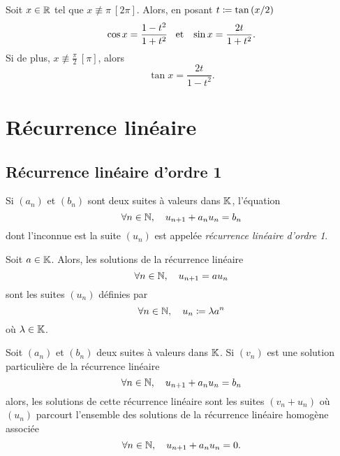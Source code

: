 \documentclass{magnolia}
\begin{document}
\begin{proposition}[utile=-3]
Soit $x\in\mathbb{R}$ tel que $x\not\equiv \pi\ [2\pi]$. Alors, en posant $t\coloneqq\tan\left(x/2\right)$
\[\cos x=\frac{1-t^2}{1+t^2} \quad\!\text{et}\quad\! \sin x=\frac{2t}{1+t^2}.\]
Si de plus, $x\not\equiv\frac{\pi}{2}\ [\pi]$, alors
\[\tan x=\frac{2t}{1-t^2}.\]
\end{proposition}



\section{Récurrence linéaire}

 \subsection{Récurrence linéaire d'ordre 1}


\begin{definition}
Si $(a_n)$ et $(b_n)$ sont deux suites à valeurs dans $\mathbb{K}$, l'équation
\[\forall n\in\mathbb{N},\quad u_{n+1} + a_n u_n = b_n\]
dont l'inconnue est la suite $(u_n)$ est appelée \emph{récurrence linéaire d'ordre 1}.
\end{definition}

\begin{proposition}
Soit $a\in\mathbb{K}$. Alors, les solutions de la récurrence linéaire
\[\forall n\in\mathbb{N},\quad u_{n+1}=a u_n\]
sont les suites $(u_n)$ définies par
\[\forall n\in\mathbb{N},\quad u_n\coloneqq \lambda a^n\]
où $\lambda\in\mathbb{K}$.
\end{proposition}

\begin{proposition}
Soit $(a_n)$ et $(b_n)$ deux suites à valeurs dans $\mathbb{K}$. Si $(v_n)$ est une solution
\og particulière \fg de la récurrence linéaire
\[\forall n\in\mathbb{N},\quad u_{n+1}+a_n u_n = b_n\]
alors, les solutions de cette récurrence linéaire sont les suites $(v_n+u_n)$ où
$(u_n)$ parcourt l'ensemble des solutions de la récurrence linéaire homogène associée
\[\forall n\in\mathbb{N},\quad u_{n+1}+a_n u_n=0.\]
\end{proposition}
\end{document}
